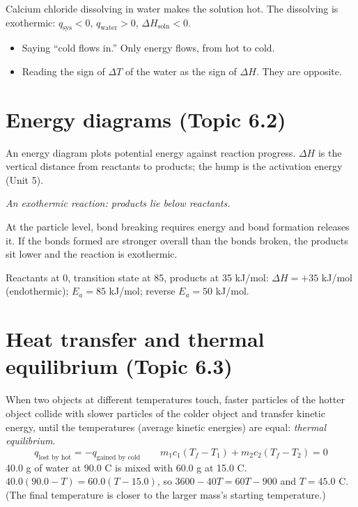 \documentclass[11pt]{article}
\begin{document}
 Calcium chloride dissolving in water makes the solution hot. The dissolving is exothermic: $q_{\text{sys}} < 0$, $q_{\text{water}} > 0$, $\Delta H_{\text{soln}} < 0$.

\errorsh
\begin{itemize}
\item Saying ``cold flows in.'' Only energy flows, from hot to cold.
\item Reading the sign of $\Delta T$ of the water as the sign of $\Delta H$. They are opposite.
\end{itemize}

\section{Energy diagrams (Topic 6.2)}\label{t:6.2}
An energy diagram plots potential energy against reaction progress. $\Delta H$ is the vertical distance from reactants to products; the hump is the activation energy (Unit 5).
\begin{center}

{\small\itshape An exothermic reaction: products lie below reactants.}
\end{center}
At the particle level, bond breaking requires energy and bond formation releases it. If the bonds formed are stronger overall than the bonds broken, the products sit lower and the reaction is exothermic.

 Reactants at 0, transition state at 85, products at 35 kJ/mol: $\Delta H = +35$ kJ/mol (endothermic); $E_a = 85$ kJ/mol; reverse $E_a = 50$ kJ/mol.

\section{Heat transfer and thermal equilibrium (Topic 6.3)}\label{t:6.3}
When two objects at different temperatures touch, faster particles of the hotter object collide with slower particles of the colder object and transfer kinetic energy, until the temperatures (average kinetic energies) are equal: \emph{thermal equilibrium}.
\[ q_{\text{lost by hot}} = -q_{\text{gained by cold}} \qquad m_1c_1(T_f - T_1) + m_2c_2(T_f - T_2) = 0 \]
 40.0 g of water at 90.0 \textdegree C is mixed with 60.0 g at 15.0 \textdegree C. $40.0(90.0 - T) = 60.0(T - 15.0)$, so $3600 - 40T = 60T - 900$ and $T = 45.0$ \textdegree C. (The final temperature is closer to the larger mass's starting temperature.)
\end{document}
